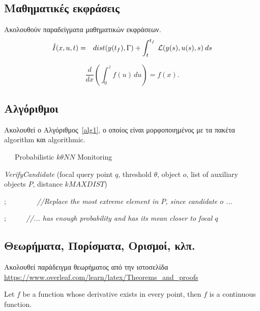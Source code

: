 \subsection{Μαθηματικές εκφράσεις}
Ακολουθούν παραδείγματα μαθηματικών εκφράσεων.
\begin{eqnarray}
\hat{I}(x,u,t)     &=& dist(y(t_f),\Gamma)
+  \int_t^{t_f} \: {\cal L}( y(s),u(s),s) \: ds
\label{con11b}
\end{eqnarray}

     \[
        \frac{d}{dx}\left( \int_{0}^{z} f(u)\,du\right)=f(x).
     \]

\subsection{Αλγόριθμοι}
Ακολουθεί ο Αλγόριθμος~\ref{alg1}, ο οποίος είναι μορφοποιημένος με τα πακέτα algorithm και algorithmic.

\begin{algorithm}[htb]
\caption{\ \ \ Probabilistic $k\theta NN$ Monitoring}
\begin{algorithmic}[1]
\begin{small}

 {\em VerifyCandidate} (focal query point $q$, threshold $\theta$, object $o$, list of auxiliary objects $P$, distance $kMAXDIST$) 


;   \ \ \ \ \ \ \ \ {\em //Replace the most extreme element in $P$, since candidate $o$ ... }

;  \ \ \ \ \ {\em //... has enough probability and has its mean closer to focal $q$ }

\ENDIF



\end{small}
\end{algorithmic}
\label{alg1}
\end{algorithm}

\subsection{Θεωρήματα, Πορίσματα, Ορισμοί, κλπ.}

Ακολουθεί παράδειγμα θεωρήματος από την ιστοσελίδα  {\small\url{https://www.overleaf.com/learn/latex/Theorems_and_proofs}}

\begin{theorem}
Let $f$ be a function whose derivative exists in every point, then $f$ 
is a continuous function.
\end{theorem}

